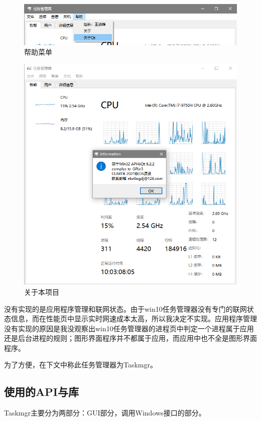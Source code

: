 \documentclass[UTF8,twoside,titlepage]{ctexart}
\begin{document}
\begin{figure}[htbp]
    \centering
    \includegraphics[scale=0.68]{../media/menubar/help menubar.png}
    \caption{帮助菜单}
    \label{fig:hlep}
\end{figure}

\begin{figure}[htb]
    \centering
    \includegraphics[scale=0.75]{../media/menubar/about dialog.png}
    \caption{关于本项目}
    \label{fig:about}
\end{figure}

没有实现的是应用程序管理和联网状态。由于win10任务管理器没有专门的联网状态信息，而在性能页中显示实时网速成本太高，所以我决定不实现。应用程序管理没有实现的原因是我没观察出win10任务管理器的进程页中判定一个进程属于应用还是后台进程的规则；图形界面程序并不都属于应用，而应用中也不全是图形界面程序。

为了方便，在下文中称此任务管理器为Taskmgr。

\subsection{使用的API与库}
Taskmgr主要分为两部分：GUI部分，调用Windows接口的部分。
\end{document}
